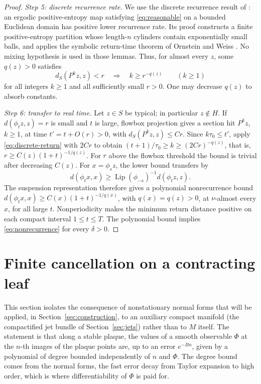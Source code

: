 \documentclass[11pt]{article}
\theoremstyle{remark}
\newcommand{\Lip}{\operatorname{Lip}}
\begin{document}
\begin{proof}
\emph{Step 5: discrete recurrence rate.}
We use the discrete recurrence result of
\cite[Section~3, Definition 13 and Lemmas 12, 14; numbering of the
arXiv version]{Saussol2004}:
an ergodic positive-entropy map satisfying
\eqref{eq:reasonable} on a bounded Euclidean domain has positive
lower recurrence rate.  Its proof constructs a finite
positive-entropy partition whose length-\(n\) cylinders contain
exponentially small balls, and applies the symbolic return-time
theorem of Ornstein and Weiss \cite{OrnsteinWeiss1993}.
No mixing hypothesis is used in those lemmas.
Thus, for almost every \(z\), some \(q(z)>0\) satisfies
\begin{equation}\label{eq:discrete-return}
 d_S(P^kz,z)<r\quad\Longrightarrow\quad k\ge r^{-q(z)}
 \qquad(k\ge1)
\end{equation}
for all integers \(k\ge1\) and all sufficiently small \(r>0\).
One may decrease \(q(z)\) to absorb constants.

\emph{Step 6: transfer to real time.}
Let \(z\in S\) be typical; in particular \(z\notin H\).
If \(d(\phi_tz,z)=r\) is small and \(t\) is large, flowbox projection
gives a section hit \(P^kz\), \(k\ge1\), at time \(t'=t+O(r)>0\),
with \(d_S(P^kz,z)\le Cr\).
Since \(k\tau_0\le t'\), apply \eqref{eq:discrete-return} with \(2Cr\)
to obtain \((t+1)/\tau_0\ge k\ge(2Cr)^{-q(z)}\), that is,
\(r\ge C(z)(1+t)^{-1/q(z)}\).
For \(r\) above the flowbox threshold the bound is trivial after
decreasing \(C(z)\).
For \(x=\phi_sz\), the lower bound transfers by
\[
 d(\phi_tx,x)\ge
       \Lip(\phi_{-s})^{-1}d(\phi_tz,z).
\]
The suspension representation therefore gives a polynomial
nonrecurrence bound \(d(\phi_tx,x)\ge C(x)(1+t)^{-1/q(x)}\), with
\(q(x)=q(z)>0\), at \(\nu\)-almost every \(x\), for all large \(t\).
Nonperiodicity makes the minimum return distance positive on each
compact interval \(1\le t\le T\).  The polynomial bound implies
\eqref{eq:nonrecurrence} for every \(\delta>0\).
\end{proof}

\section{Finite cancellation on a contracting leaf}
\label{sec:cancellation}

This section isolates the consequence of nonstationary normal forms
that will be applied, in Section~\ref{sec:construction}, to an
auxiliary compact manifold (the compactified jet bundle of
Section~\ref{sec:jets}) rather than to \(M\) itself.
The statement is that along a stable plaque, the
values of a smooth observable \(\Phi\) at the \(n\)-th images of the
plaque points are, up to an error \(e^{-Bn}\), given by a polynomial
of degree bounded independently of \(n\) and \(\Phi\).  The degree
bound comes from the normal forms, the fast error decay from Taylor
expansion to high order, which is where differentiability of
\(\Phi\) is paid for.
\end{document}

